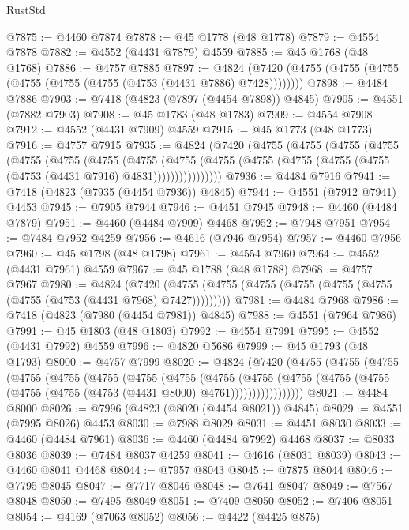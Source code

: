 \begin{lexlean}{RustStd}
\begin{coremodule}
@7875 := @4460 @7874
@7878 := @45 @1778 (@48 @1778)
@7879 := @4554 @7878
@7882 := @4552 (@4431 @7879) @4559
@7885 := @45 @1768 (@48 @1768)
@7886 := @4757 @7885
@7897 := @4824 (@7420 (@4755 (@4755 (@4755 (@4755 (@4755 (@4755 (@4753 (@4431 @7886) @7428))))))))
@7898 := @4484 @7886
@7903 := @7418 (@4823 (@7897 (@4454 @7898)) @4845)
@7905 := @4551 (@7882 @7903)
@7908 := @45 @1783 (@48 @1783)
@7909 := @4554 @7908
@7912 := @4552 (@4431 @7909) @4559
@7915 := @45 @1773 (@48 @1773)
@7916 := @4757 @7915
@7935 := @4824
    (@7420
      (@4755
        (@4755
          (@4755
            (@4755
              (@4755
                (@4755
                  (@4755
                    (@4755
                      (@4755
                        (@4755
                          (@4755 (@4755 (@4755 (@4755 (@4753 (@4431 @7916) @4831))))))))))))))))
@7936 := @4484 @7916
@7941 := @7418 (@4823 (@7935 (@4454 @7936)) @4845)
@7944 := @4551 (@7912 @7941) @4453
@7945 := @7905 @7944
@7946 := @4451 @7945
@7948 := @4460 (@4484 @7879)
@7951 := @4460 (@4484 @7909) @4468
@7952 := @7948 @7951
@7954 := @7484 @7952 @4259
@7956 := @4616 (@7946 @7954)
@7957 := @4460 @7956
@7960 := @45 @1798 (@48 @1798)
@7961 := @4554 @7960
@7964 := @4552 (@4431 @7961) @4559
@7967 := @45 @1788 (@48 @1788)
@7968 := @4757 @7967
@7980 := @4824
    (@7420 (@4755 (@4755 (@4755 (@4755 (@4755 (@4755 (@4755 (@4753 (@4431 @7968) @7427)))))))))
@7981 := @4484 @7968
@7986 := @7418 (@4823 (@7980 (@4454 @7981)) @4845)
@7988 := @4551 (@7964 @7986)
@7991 := @45 @1803 (@48 @1803)
@7992 := @4554 @7991
@7995 := @4552 (@4431 @7992) @4559
@7996 := @4820 @5686
@7999 := @45 @1793 (@48 @1793)
@8000 := @4757 @7999
@8020 := @4824
    (@7420
      (@4755
        (@4755
          (@4755
            (@4755
              (@4755
                (@4755
                  (@4755
                    (@4755
                      (@4755
                        (@4755
                          (@4755
                            (@4755 (@4755 (@4755 (@4755 (@4753 (@4431 @8000) @4761)))))))))))))))))
@8021 := @4484 @8000
@8026 := @7996 (@4823 (@8020 (@4454 @8021)) @4845)
@8029 := @4551 (@7995 @8026) @4453
@8030 := @7988 @8029
@8031 := @4451 @8030
@8033 := @4460 (@4484 @7961)
@8036 := @4460 (@4484 @7992) @4468
@8037 := @8033 @8036
@8039 := @7484 @8037 @4259
@8041 := @4616 (@8031 @8039)
@8043 := @4460 @8041 @4468
@8044 := @7957 @8043
@8045 := @7875 @8044
@8046 := @7795 @8045
@8047 := @7717 @8046
@8048 := @7641 @8047
@8049 := @7567 @8048
@8050 := @7495 @8049
@8051 := @7409 @8050
@8052 := @7406 @8051
@8054 := @4169 (@7063 @8052)
@8056 := @4422 (@4425 @875)

\end{coremodule}
\end{lexlean}
